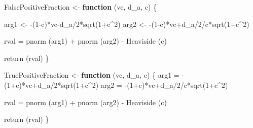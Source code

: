\documentclass[
]{book}
\newenvironment{Shaded}{\begin{snugshade}}{\end{snugshade}}
\newcommand{\ControlFlowTok}[1]{\textcolor[rgb]{0.13,0.29,0.53}{\textbf{#1}}}
\newcommand{\DecValTok}[1]{\textcolor[rgb]{0.00,0.00,0.81}{#1}}
\newcommand{\FunctionTok}[1]{\textcolor[rgb]{0.00,0.00,0.00}{#1}}
\newcommand{\NormalTok}[1]{#1}
\newcommand{\OtherTok}[1]{\textcolor[rgb]{0.56,0.35,0.01}{#1}}
\newcommand{\SpecialCharTok}[1]{\textcolor[rgb]{0.00,0.00,0.00}{#1}}
\begin{document}
\begin{Shaded}
\begin{Highlighting}[]
\NormalTok{FalsePositiveFraction }\OtherTok{\textless{}{-}} \ControlFlowTok{function}\NormalTok{ (vc, d\_a, c)}
\NormalTok{\{}
  
\NormalTok{  arg1 }\OtherTok{\textless{}{-}}  \SpecialCharTok{{-}}\NormalTok{(}\DecValTok{1}\SpecialCharTok{{-}}\NormalTok{c)}\SpecialCharTok{*}\NormalTok{vc}\SpecialCharTok{{-}}\NormalTok{d\_a}\SpecialCharTok{/}\DecValTok{2}\SpecialCharTok{*}\FunctionTok{sqrt}\NormalTok{(}\DecValTok{1}\SpecialCharTok{+}\NormalTok{c}\SpecialCharTok{\^{}}\DecValTok{2}\NormalTok{)}
\NormalTok{  arg2 }\OtherTok{\textless{}{-}}  \SpecialCharTok{{-}}\NormalTok{(}\DecValTok{1}\SpecialCharTok{{-}}\NormalTok{c)}\SpecialCharTok{*}\NormalTok{vc}\SpecialCharTok{+}\NormalTok{d\_a}\SpecialCharTok{/}\DecValTok{2}\SpecialCharTok{/}\NormalTok{c}\SpecialCharTok{*}\FunctionTok{sqrt}\NormalTok{(}\DecValTok{1}\SpecialCharTok{+}\NormalTok{c}\SpecialCharTok{\^{}}\DecValTok{2}\NormalTok{)}
  
\NormalTok{  rval }\OtherTok{=} \FunctionTok{pnorm}\NormalTok{ (arg1) }\SpecialCharTok{+} \FunctionTok{pnorm}\NormalTok{ (arg2) }\SpecialCharTok{{-}} \FunctionTok{Heaviside}\NormalTok{ (c)}
  
  \FunctionTok{return}\NormalTok{ (rval)}
\NormalTok{\}}



\NormalTok{TruePositiveFraction }\OtherTok{\textless{}{-}} \ControlFlowTok{function}\NormalTok{ (vc, d\_a, c)}
\NormalTok{\{}
\NormalTok{  arg1 }\OtherTok{=} \SpecialCharTok{{-}}\NormalTok{(}\DecValTok{1}\SpecialCharTok{+}\NormalTok{c)}\SpecialCharTok{*}\NormalTok{vc}\SpecialCharTok{+}\NormalTok{d\_a}\SpecialCharTok{/}\DecValTok{2}\SpecialCharTok{*}\FunctionTok{sqrt}\NormalTok{(}\DecValTok{1}\SpecialCharTok{+}\NormalTok{c}\SpecialCharTok{\^{}}\DecValTok{2}\NormalTok{)}
\NormalTok{  arg2 }\OtherTok{=} \SpecialCharTok{{-}}\NormalTok{(}\DecValTok{1}\SpecialCharTok{+}\NormalTok{c)}\SpecialCharTok{*}\NormalTok{vc}\SpecialCharTok{+}\NormalTok{d\_a}\SpecialCharTok{/}\DecValTok{2}\SpecialCharTok{/}\NormalTok{c}\SpecialCharTok{*}\FunctionTok{sqrt}\NormalTok{(}\DecValTok{1}\SpecialCharTok{+}\NormalTok{c}\SpecialCharTok{\^{}}\DecValTok{2}\NormalTok{)}
  
\NormalTok{  rval }\OtherTok{=} \FunctionTok{pnorm}\NormalTok{ (arg1) }\SpecialCharTok{+} \FunctionTok{pnorm}\NormalTok{ (arg2) }\SpecialCharTok{{-}} \FunctionTok{Heaviside}\NormalTok{ (c)}
  
  \FunctionTok{return}\NormalTok{ (rval)}
\NormalTok{\}}
\end{Highlighting}
\end{Shaded}
\end{document}
